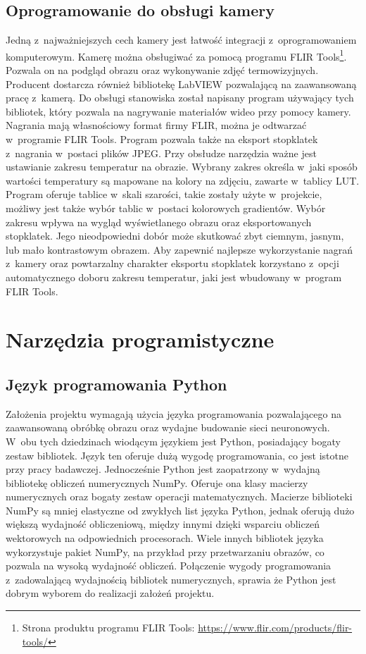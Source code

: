 \subsection{Oprogramowanie do obsługi kamery}
\label{subsec:camera_soft}
Jedną z~najważniejszych cech kamery jest łatwość integracji
z~oprogramowaniem komputerowym.
Kamerę można obsługiwać za pomocą programu FLIR Tools\footnote{Strona produktu
	programu FLIR Tools: \url{https://www.flir.com/products/flir-tools/}}.
Pozwala on na podgląd obrazu oraz wykonywanie zdjęć termowizyjnych.
Producent dostarcza również bibliotekę LabVIEW pozwalającą na zaawansowaną
pracę z~kamerą.
Do obsługi stanowiska został napisany program używający tych bibliotek,
który pozwala na nagrywanie materiałów wideo przy pomocy kamery.
Nagrania mają własnościowy format firmy FLIR, można je odtwarzać w~programie
FLIR Tools.
Program pozwala także na eksport stopklatek z~nagrania w~postaci plików JPEG.
Przy obsłudze narzędzia ważne jest ustawianie zakresu temperatur na obrazie.
Wybrany zakres określa w~jaki sposób wartości temperatury są mapowane na
kolory na zdjęciu, zawarte w~tablicy LUT.
Program oferuje tablice w~skali szarości, takie zostały użyte w~projekcie,
możliwy jest także wybór tablic w~postaci kolorowych gradientów.
Wybór zakresu wpływa na wygląd wyświetlanego obrazu oraz eksportowanych
stopklatek.
Jego nieodpowiedni dobór może skutkować zbyt ciemnym, jasnym, lub mało
kontrastowym obrazem.
Aby zapewnić najlepsze wykorzystanie nagrań z~kamery oraz powtarzalny
charakter eksportu stopklatek korzystano z~opcji automatycznego doboru
zakresu temperatur, jaki jest wbudowany w~program FLIR Tools.

\section{Narzędzia programistyczne}

\subsection{Język programowania Python}
Założenia projektu wymagają użycia języka programowania pozwalającego
na zaawansowaną obróbkę obrazu oraz wydajne budowanie sieci neuronowych.
W~obu tych dziedzinach wiodącym językiem jest Python, posiadający bogaty
zestaw bibliotek.
Język ten oferuje dużą wygodę programowania, co jest istotne przy pracy
badawczej.
Jednocześnie Python jest zaopatrzony w~wydajną bibliotekę obliczeń
numerycznych NumPy.
Oferuje ona klasy macierzy numerycznych oraz bogaty zestaw operacji
matematycznych.
Macierze biblioteki NumPy są mniej elastyczne od zwykłych list języka Python,
jednak oferują dużo większą wydajność obliczeniową, między innymi dzięki
wsparciu obliczeń wektorowych na odpowiednich procesorach.
Wiele innych bibliotek języka wykorzystuje pakiet NumPy, na przykład przy
przetwarzaniu obrazów, co pozwala na wysoką wydajność obliczeń.
Połączenie wygody programowania z~zadowalającą wydajnością bibliotek
numerycznych, sprawia że Python jest dobrym wyborem do realizacji
założeń projektu.

